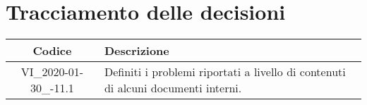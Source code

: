 \section*{Tracciamento delle decisioni}

\begin{center}
	\begin{longtable}{|c|p{12.25cm}|}
	\hline
	\rowcolor{lighter-grayer}
	\textbf{Codice} & \textbf{Descrizione} \\
	\hline
	\endfirsthead
	
	\hline
	VI\_2020-01-30\_-11.1 & Definiti i problemi riportati a livello di contenuti di alcuni documenti interni. \\
	\hline

	\end{longtable}
\end{center}